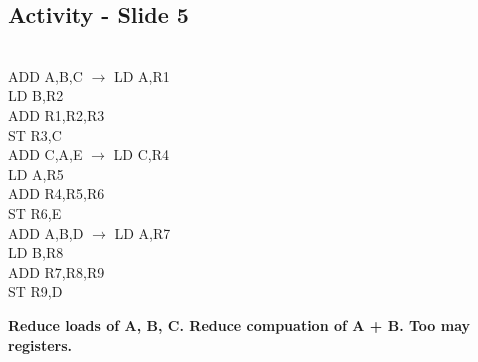 \documentclass{report}
\begin{document}
\vspace{-1.5em}
\subsection{Activity - Slide 5}
\vspace{-1em}
\begin{multicols}{6}
 \ \\
ADD A,B,C $\longrightarrow$
\vfill\columnbreak
LD A,R1 \\
LD B,R2 \\
ADD R1,R2,R3 \\
ST R3,C
\vfill\columnbreak
 \ \\
ADD C,A,E $\longrightarrow$
\vfill\columnbreak
LD C,R4 \\
LD A,R5 \\
ADD R4,R5,R6 \\
ST R6,E
\vfill\columnbreak
 \ \\
ADD A,B,D $\longrightarrow$
\vfill\columnbreak
LD A,R7 \\
LD B,R8 \\
ADD R7,R8,R9 \\
ST R9,D
\end{multicols}
\vspace{-1em}
\textbf{Reduce loads of A, B, C. Reduce compuation of A + B. Too may registers.} \\


\vspace{-1.5em}
\end{document}

